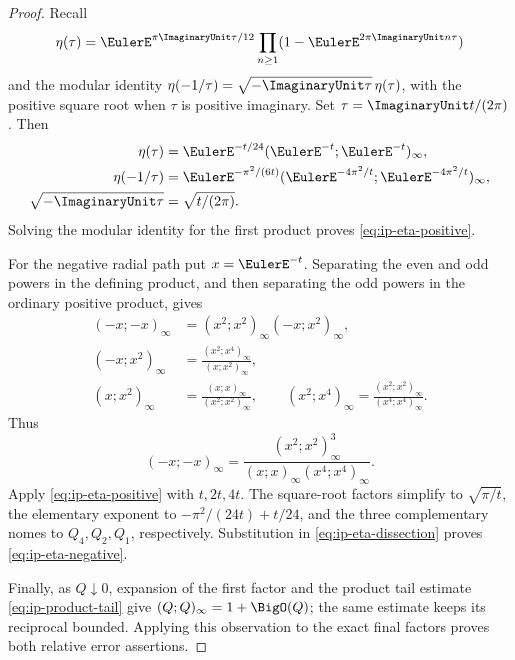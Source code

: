 \begin{proof}
Recall
\[
 \eta(\tau)=\EulerE^{\pi\ImaginaryUnit\tau/12}
 \prod_{n\geq1}(1-\EulerE^{2\pi\ImaginaryUnit n\tau})
\]
and the modular identity
\(\eta(-1/\tau)=\sqrt{-\ImaginaryUnit\tau}\,\eta(\tau)\), with the positive square root
when \(\tau\) is positive imaginary.  Set \(\tau=\ImaginaryUnit t/(2\pi)\).  Then
\begin{align*}
 \eta(\tau)&=\EulerE^{-t/24}(\EulerE^{-t};\EulerE^{-t})_\infty,\\
 \eta(-1/\tau)&=\EulerE^{-\pi^2/(6t)}
 (\EulerE^{-4\pi^2/t};\EulerE^{-4\pi^2/t})_\infty,\\
 \sqrt{-\ImaginaryUnit\tau}&=\sqrt{t/(2\pi)}.
\end{align*}
Solving the modular identity for the first product proves
\cref{eq:ip-eta-positive}.

For the negative radial path put \(x=\EulerE^{-t}\).  Separating the even and odd
powers in the defining product, and then separating the odd powers in the
ordinary positive product, gives
\begin{align*}
 (-x;-x)_\infty
  &=(x^2;x^2)_\infty(-x;x^2)_\infty,\\
 (-x;x^2)_\infty
  &=\frac{(x^2;x^4)_\infty}{(x;x^2)_\infty},\\
 (x;x^2)_\infty
  &=\frac{(x;x)_\infty}{(x^2;x^2)_\infty},
 \qquad
 (x^2;x^4)_\infty
  =\frac{(x^2;x^2)_\infty}{(x^4;x^4)_\infty}.
\end{align*}
Thus
\begin{equation}
 (-x;-x)_\infty
 =\frac{(x^2;x^2)_\infty^3}
 {(x;x)_\infty(x^4;x^4)_\infty}.
 \label{eq:ip-eta-dissection}
\end{equation}
Apply \cref{eq:ip-eta-positive} with \(t,2t,4t\).  The square-root factors
simplify to \(\sqrt{\pi/t}\), the elementary exponent to
\(-\pi^2/(24t)+t/24\), and the three complementary nomes to
\(Q_4,Q_2,Q_1\), respectively.  Substitution in
\cref{eq:ip-eta-dissection} proves \cref{eq:ip-eta-negative}.

Finally, as \(Q\downarrow0\), expansion of the first factor and the product
tail estimate \cref{eq:ip-product-tail} give
\((Q;Q)_\infty=1+\BigO(Q)\); the same estimate keeps its reciprocal bounded.
Applying this observation to the exact final factors proves both relative
error assertions.
\end{proof}


